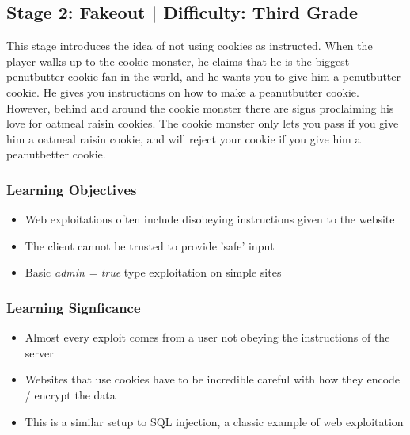 \documentclass{article}
\begin{document}
\subsection{Stage 2: Fakeout | Difficulty: Third Grade}

This stage introduces the idea of not using cookies as instructed. When the player
walks up to the cookie monster, he claims that he is the biggest
penutbutter cookie fan in the world, and he wants you to give him a
penutbutter cookie. He gives you instructions on how to make a
peanutbutter cookie. However, behind and around the cookie monster there are
signs proclaiming his love for oatmeal raisin cookies. The cookie
monster only lets you pass if you give him a oatmeal raisin cookie,
and will reject your cookie if you give him a peanutbetter cookie. 

\subsubsection{Learning Objectives}

\begin{itemize}
  \item Web exploitations often include disobeying instructions given
    to the website
  \item The client cannot be trusted to provide 'safe' input
  \item Basic \textit{admin = true} type exploitation on simple sites
\end{itemize}

\subsubsection{Learning Signficance}

\begin{itemize}
  \item Almost every exploit comes from a user not obeying the
    instructions of the server
  \item Websites that use cookies have to be incredible careful with
    how they encode / encrypt the data
  \item This is a similar setup to SQL injection, a classic example of
    web exploitation
\end{itemize}
\end{document}
